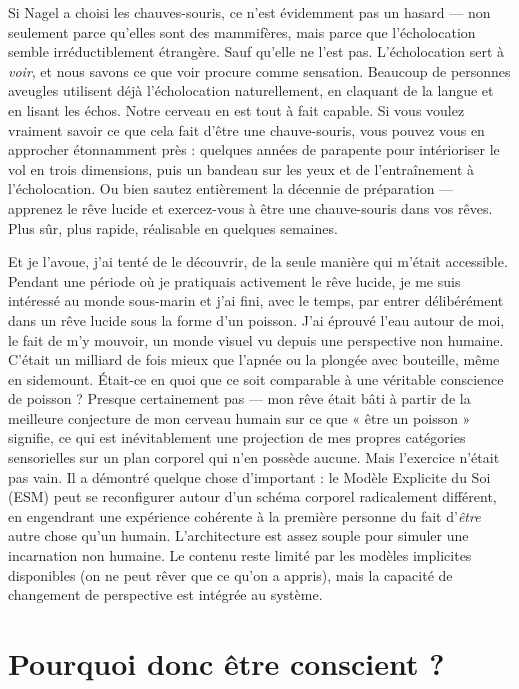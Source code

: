 \documentclass[11pt, twoside, openright]{book}
\begin{document}
Si Nagel a choisi les chauves-souris, ce n'est évidemment pas un hasard --- non seulement parce qu'elles sont des mammifères, mais parce que l'écholocation semble irréductiblement étrangère. Sauf qu'elle ne l'est pas. L'écholocation sert à \textit{voir}, et nous savons ce que voir procure comme sensation. Beaucoup de personnes aveugles utilisent déjà l'écholocation naturellement, en claquant de la langue et en lisant les échos. Notre cerveau en est tout à fait capable. Si vous voulez vraiment savoir ce que cela fait d'être une chauve-souris, vous pouvez vous en approcher étonnamment près : quelques années de parapente pour intérioriser le vol en trois dimensions, puis un bandeau sur les yeux et de l'entraînement à l'écholocation. Ou bien sautez entièrement la décennie de préparation --- apprenez le rêve lucide et exercez-vous à être une chauve-souris dans vos rêves. Plus sûr, plus rapide, réalisable en quelques semaines.

Et je l'avoue, j'ai tenté de le découvrir, de la seule manière qui m'était accessible. Pendant une période où je pratiquais activement le rêve lucide, je me suis intéressé au monde sous-marin et j'ai fini, avec le temps, par entrer délibérément dans un rêve lucide sous la forme d'un poisson. J'ai éprouvé l'eau autour de moi, le fait de m'y mouvoir, un monde visuel vu depuis une perspective non humaine. C'était un milliard de fois mieux que l'apnée ou la plongée avec bouteille, même en sidemount. Était-ce en quoi que ce soit comparable à une véritable conscience de poisson ? Presque certainement pas --- mon rêve était bâti à partir de la meilleure conjecture de mon cerveau humain sur ce que « être un poisson » signifie, ce qui est inévitablement une projection de mes propres catégories sensorielles sur un plan corporel qui n'en possède aucune. Mais l'exercice n'était pas vain. Il a démontré quelque chose d'important : le Modèle Explicite du Soi (ESM) peut se reconfigurer autour d'un schéma corporel radicalement différent, en engendrant une expérience cohérente à la première personne du fait d'\textit{être} autre chose qu'un humain. L'architecture est assez souple pour simuler une incarnation non humaine. Le contenu reste limité par les modèles implicites disponibles (on ne peut rêver que ce qu'on a appris), mais la capacité de changement de perspective est intégrée au système.

\section*{Pourquoi donc être conscient ?}
\end{document}
